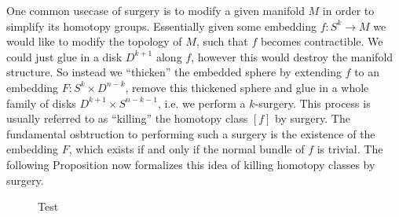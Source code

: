 One common usecase of surgery is to modify a given manifold $M$ in order to simplify its homotopy groups. Essentially given some embedding $f \colon S^k \to M$ we would like to modify the topology of $M$, such that $f$ becomes contractible. We could just glue in a disk $D^{k+1}$ along $f$, however this would destroy the manifold structure. So instead we ``thicken'' the embedded sphere by extending $f$ to an embedding $F \colon S^k \times D^{n-k}$, remove this thickened sphere and glue in a whole family of disks $D^{k+1} \times S^{n-k-1}$, i.e. we perform a $k$-surgery. This process is usually referred to as ``killing'' the homotopy class $[f]$ by surgery. The fundamental osbtruction to performing such a surgery is the existence of the embedding $F$, which exists if and only if the normal bundle of $f$ is trivial. The following Proposition now formalizes this idea of killing homotopy classes by surgery. 

\needspace{5cm}


\begin{figure}
    \centering
    \caption{Test}
\end{figure}

